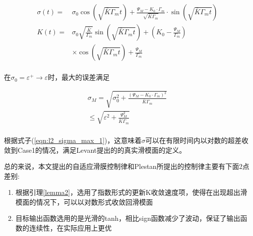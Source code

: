 \begin{equation}
    \begin{aligned}
        \sigma (t)=&\sigma _0\cos \left( \sqrt{\bar{K}\Gamma _m}t \right) +\frac{\Psi _M-K_0\cdot \Gamma _m}{\sqrt{\bar{K}\Gamma _m}}\cdot \sin \left( \sqrt{\bar{K}\Gamma _mt} \right)\\
        K(t)=&\sigma _0\sqrt{\frac{\bar{K}}{\Gamma _m}}\sin \left( \sqrt{\bar{K}\Gamma _mt} \right) +\left( K_0-\frac{\Psi _M}{\Gamma _m} \right)\\
        &\times \cos \left( \sqrt{\bar{K}\Gamma _mt} \right) +\frac{\Psi _M}{\Gamma _m}\\
    \end{aligned}
\end{equation}

在$\sigma _0=\varepsilon ^+\rightarrow \varepsilon$时，最大的误差满足

\begin{equation}
    \begin{array}{c}
        \sigma _M=\sqrt{\sigma _{0}^{2}+\frac{\left( \Psi _M-K_0\cdot \Gamma _m \right) ^2}{\bar{K}\Gamma _m}}\\
        \le \sqrt{\varepsilon ^2+\frac{\Psi _{M}^{2}}{\bar{K}\Gamma _m}}\\
    \end{array}
\end{equation}

根据式子(\ref{eqn:l2_sigma_max_1})，这意味着$\sigma$可以在有限时间内以对数的超差收敛到Case1的情况，满足Levant提出的的真实滑模面的定义\cite{levantSlidingOrderSliding1993}。

总的来说，本文提出的自适应滑膜控制律和Plestan所提出的控制律主要有下面2点差别:
\begin{enumerate}
    \item 根据引理\ref{lemma2}，选用了指数形式的更新K收敛速度项，使得在出现超出滑模面的情况下，可以以对数形式收敛回滑模面
    \item 目标输出函数选用的是光滑的tanh，相比sign函数减少了波动，保证了输出函数的连续性，在实际应用上更优
\end{enumerate}
\FloatBarrier